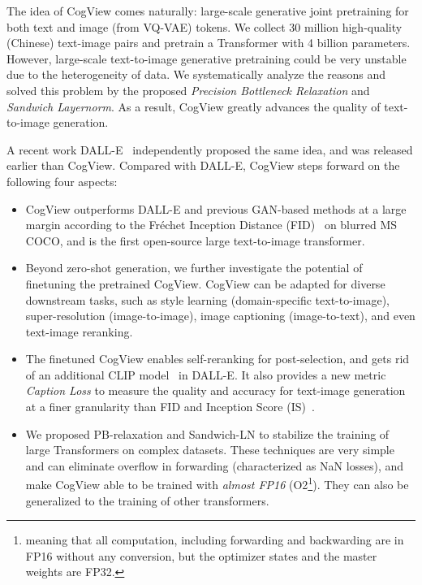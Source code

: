 The idea of CogView comes naturally: large-scale generative joint pretraining for both text and image (from VQ-VAE) tokens. We collect 30 million high-quality (Chinese) text-image pairs and pretrain a Transformer with 4 billion parameters. However, large-scale text-to-image generative pretraining could be very unstable due to the heterogeneity of data. We systematically analyze the reasons and solved this problem by the proposed \emph{Precision Bottleneck Relaxation} and \emph{Sandwich Layernorm}. As a result, CogView greatly advances the quality of text-to-image generation. 

A recent work DALL-E~\cite{ramesh2021zero} independently proposed the same idea, and was released earlier than CogView. Compared with DALL-E, CogView steps forward on the following four aspects:

\begin{itemize}
    \item CogView outperforms DALL-E and previous GAN-based methods at a large margin according to the Fr\'echet Inception Distance (FID)~\cite{heusel2017gans} on blurred MS COCO, and is the first open-source large text-to-image transformer. 
    \item Beyond zero-shot generation, we further investigate the potential of finetuning the pretrained CogView. CogView can be adapted for diverse downstream tasks, such as style learning (domain-specific text-to-image), super-resolution (image-to-image), image captioning (image-to-text), and even text-image reranking.
    \item The finetuned CogView enables self-reranking for post-selection, and gets rid of an additional CLIP model~\cite{radford2021learning} in DALL-E. It also provides a new metric \emph{Caption Loss} to measure the quality and accuracy for text-image generation at a finer granularity than FID and Inception Score (IS)~\cite{salimans2016improved}.  
    \item We proposed PB-relaxation and Sandwich-LN to stabilize the training of large Transformers on complex datasets. These techniques are very simple and can eliminate overflow in forwarding (characterized as NaN losses), and make CogView able to be trained with \emph{almost FP16} (O2\footnote{meaning that all computation, including forwarding and backwarding are in FP16 without any conversion, but the optimizer states and the master weights are FP32.}). They can also be generalized to the training of other transformers.

\end{itemize}

